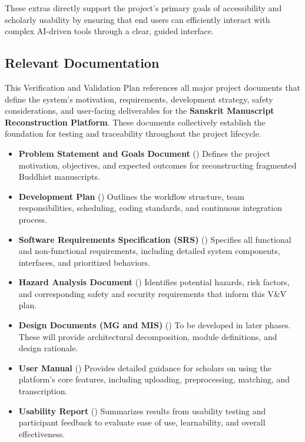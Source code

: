 \documentclass[12pt, titlepage]{article}
\begin{document}
These extras directly support the project’s primary goals of accessibility and scholarly usability by ensuring that end users can efficiently interact with complex AI-driven tools through a clear, guided interface.

\subsection{Relevant Documentation}

This Verification and Validation Plan references all major project documents that define the system’s motivation, requirements, development strategy, safety considerations, and user-facing deliverables for the \textbf{Sanskrit Manuscript Reconstruction Platform}. These documents collectively establish the foundation for testing and traceability throughout the project lifecycle.

\begin{itemize}
    \item \textbf{Problem Statement and Goals Document} (\citet{ProblemStatement})  
    Defines the project motivation, objectives, and expected outcomes for reconstructing fragmented Buddhist manuscripts.

    \item \textbf{Development Plan} (\citet{DevelopmentPlan})  
    Outlines the workflow structure, team responsibilities, scheduling, coding standards, and continuous integration process.

    \item \textbf{Software Requirements Specification (SRS)} (\citet{SRS-Sanskrit-Ciphers})  
    Specifies all functional and non-functional requirements, including detailed system components, interfaces, and prioritized behaviors.

    \item \textbf{Hazard Analysis Document} (\citet{HazardAnalysis})  
    Identifies potential hazards, risk factors, and corresponding safety and security requirements that inform this V\&V plan.

    \item \textbf{Design Documents (MG and MIS)} (\citet{DesignDocs})  
    To be developed in later phases. These will provide architectural decomposition, module definitions, and design rationale.

    \item \textbf{User Manual} (\citet{UserManual})  
    Provides detailed guidance for scholars on using the platform’s core features, including uploading, preprocessing, matching, and transcription.

    \item \textbf{Usability Report} (\citet{UsabilityReport})  
    Summarizes results from usability testing and participant feedback to evaluate ease of use, learnability, and overall effectiveness.
\end{itemize}
\end{document}
